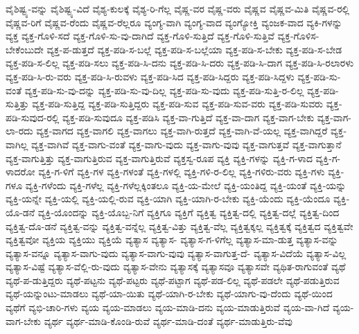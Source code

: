 {ವೈಶಿಷ್ಟ್ಯ-ವನ್ನು
ವೈಶಿಷ್ಟ್ಯ-ವಿದೆ
ವೈಶ್ಯ-ಕುಲಕ್ಕೆ
ವೈಶ್ಯ-ರಿ-ಗೆಲ್ಲ
ವೈಷ್ಣ-ವರ
ವೈಷ್ಣ-ವರು
ವೈಷ್ಣವ
ವೈಷ್ಣವ-ಮಿತಿ
ವೈಷ್ಣವ-ರಲ್ಲಿ
ವೈಷ್ಣವ-ರಿಗೆ
ವೈಷ್ಣವ-ರೆಂದು
ವೈಷ್ಣವ-ರೆಲ್ಲರೂ
ವ್ಯಂಗ್ಯ-ವಾಗಿ
ವ್ಯಂಗ್ಯ-ವಾದ
ವ್ಯಂಗ್ಯೋಕ್ತಿ
ವ್ಯಂಜಕ-ವಾದ
ವ್ಯಕಿ-ಗಳನ್ನು
ವ್ಯಕ್ತ
ವ್ಯಕ್ತ-ಗೊಳಿ-ಸದೆ
ವ್ಯಕ್ತ-ಗೊಳಿ-ಸು-ವು-ದಾಗಿದೆ
ವ್ಯಕ್ತ-ಗೊಳಿ-ಸುತ್ತಿದೆ
ವ್ಯಕ್ತ-ಗೊಳಿ-ಸುತ್ತಿವೆ
ವ್ಯಕ್ತ-ಗೊಳಿಸ-ಬೇಕೆಂಬುದೇ
ವ್ಯಕ್ತ-ಪ-ಡುತ್ತದೆ
ವ್ಯಕ್ತ-ಪಡಿ-ಸ-ಬಲ್ಲೆ
ವ್ಯಕ್ತ-ಪಡಿ-ಸ-ಬಲ್ಲೆಯಾ
ವ್ಯಕ್ತ-ಪಡಿ-ಸ-ಬೇಕು
ವ್ಯಕ್ತ-ಪಡಿ-ಸ-ಬೇಡ
ವ್ಯಕ್ತ-ಪಡಿ-ಸ-ಲಿಲ್ಲ
ವ್ಯಕ್ತ-ಪಡಿ-ಸಲು
ವ್ಯಕ್ತ-ಪಡಿ-ಸಿ-ದನು
ವ್ಯಕ್ತ-ಪಡಿ-ಸಿ-ದರು
ವ್ಯಕ್ತ-ಪಡಿ-ಸಿ-ದಾಗ
ವ್ಯಕ್ತ-ಪಡಿ-ಸಿ-ರಲಾರಳು
ವ್ಯಕ್ತ-ಪಡಿ-ಸಿ-ರು-ವರು
ವ್ಯಕ್ತ-ಪಡಿ-ಸಿ-ರುವಳು
ವ್ಯಕ್ತ-ಪಡಿ-ಸಿದ
ವ್ಯಕ್ತ-ಪಡಿ-ಸಿದ್ದರು
ವ್ಯಕ್ತ-ಪಡಿ-ಸಿದ್ದಳು
ವ್ಯಕ್ತ-ಪಡಿ-ಸು-ವಂತೆ
ವ್ಯಕ್ತ-ಪಡಿ-ಸು-ವು-ದನ್ನು
ವ್ಯಕ್ತ-ಪಡಿ-ಸು-ವು-ದಿಲ್ಲ
ವ್ಯಕ್ತ-ಪಡಿ-ಸು-ವುದು
ವ್ಯಕ್ತ-ಪಡಿ-ಸುತ್ತಿ-ರ-ಲಿಲ್ಲ
ವ್ಯಕ್ತ-ಪಡಿ-ಸುತ್ತಿತ್ತು
ವ್ಯಕ್ತ-ಪಡಿ-ಸುತ್ತಿದ್ದ
ವ್ಯಕ್ತ-ಪಡಿ-ಸುತ್ತಿದ್ದರು
ವ್ಯಕ್ತ-ಪಡಿ-ಸುವ
ವ್ಯಕ್ತ-ಪಡಿ-ಸುವ-ವರು
ವ್ಯಕ್ತ-ಪಡಿ-ಸುವರು
ವ್ಯಕ್ತ-ಪಡಿ-ಸುವುದ-ರಲ್ಲಿ
ವ್ಯಕ್ತ-ಪಡಿ-ಸುವುದೂ
ವ್ಯಕ್ತ-ಪಡಿಸಿ
ವ್ಯಕ್ತ-ವಾ-ಗುತ್ತಿದೆ
ವ್ಯಕ್ತ-ವಾ-ದಾಗ
ವ್ಯಕ್ತ-ವಾಗ-ಬೇಕು
ವ್ಯಕ್ತ-ವಾಗ-ಲಾ-ರದು
ವ್ಯಕ್ತ-ವಾಗದ
ವ್ಯಕ್ತ-ವಾಗಲಿ
ವ್ಯಕ್ತ-ವಾಗಲು
ವ್ಯಕ್ತ-ವಾಗಿ-ರುತ್ತದೆ
ವ್ಯಕ್ತ-ವಾಗಿ-ವೆ-ಯಲ್ಲ
ವ್ಯಕ್ತ-ವಾಗಿದ್ದರೆ
ವ್ಯಕ್ತ-ವಾಗಿಲ್ಲ
ವ್ಯಕ್ತ-ವಾಗಿವೆ
ವ್ಯಕ್ತ-ವಾಗು-ವಂತೆ
ವ್ಯಕ್ತ-ವಾಗು-ವುದು
ವ್ಯಕ್ತ-ವಾಗು-ವುವು
ವ್ಯಕ್ತ-ವಾಗುತ್ತವೆ
ವ್ಯಕ್ತ-ವಾಗುತ್ತಾನೆ
ವ್ಯಕ್ತ-ವಾಗುತ್ತಿತ್ತು
ವ್ಯಕ್ತ-ವಾಗುತ್ತಿರುವ
ವ್ಯಕ್ತ-ವಾಗುತ್ತಿರುವೆ
ವ್ಯಕ್ತಸ್ವ-ರೂಪ
ವ್ಯಕ್ತಿ
ವ್ಯಕ್ತಿ-ಗಳನ್ನು
ವ್ಯಕ್ತಿ-ಗ-ಳಾದ
ವ್ಯಕ್ತಿ-ಗ-ಳಾದರೋ
ವ್ಯಕ್ತಿ-ಗ-ಳಿಗೆ
ವ್ಯಕ್ತಿ-ಗಳ
ವ್ಯಕ್ತಿ-ಗಳಂತೆ
ವ್ಯಕ್ತಿ-ಗಳಲ್ಲಿ
ವ್ಯಕ್ತಿ-ಗಳಿ-ರ-ಲಿಲ್ಲ
ವ್ಯಕ್ತಿ-ಗಳಿರು-ವರು
ವ್ಯಕ್ತಿ-ಗಳು
ವ್ಯಕ್ತಿ-ಗಳೂ
ವ್ಯಕ್ತಿ-ಗಳೆಂದು
ವ್ಯಕ್ತಿ-ಗಳೆಲ್ಲ
ವ್ಯಕ್ತಿ-ಗಳೆಲ್ಲಕ್ಕಿಂತಲೂ
ವ್ಯಕ್ತಿ-ಯ-ಮೇಲೆ
ವ್ಯಕ್ತಿ-ಯಂತಿದ್ದ
ವ್ಯಕ್ತಿ-ಯಂತೆ
ವ್ಯಕ್ತಿ-ಯನ್ನು
ವ್ಯಕ್ತಿ-ಯನ್ನೇ
ವ್ಯಕ್ತಿ-ಯಲ್ಲಿ
ವ್ಯಕ್ತಿ-ಯಲ್ಲಿ-ರುವ
ವ್ಯಕ್ತಿ-ಯಾಗಿ
ವ್ಯಕ್ತಿ-ಯಾಗಿ-ರ-ಬೇಕು
ವ್ಯಕ್ತಿ-ಯೆಂದು
ವ್ಯಕ್ತಿ-ಯೆಂದೂ
ವ್ಯಕ್ತಿ-ಯೊ-ಡನೆ
ವ್ಯಕ್ತಿ-ಯೊಂದನ್ನು
ವ್ಯಕ್ತಿ-ಯೊಬ್ಬ-ನಿಗೆ
ವ್ಯಕ್ತಿಗೂ
ವ್ಯಕ್ತಿಗೆ
ವ್ಯಕ್ತಿತ್ವ
ವ್ಯಕ್ತಿತ್ವ-ದಲ್ಲಿ
ವ್ಯಕ್ತಿತ್ವ-ದಲ್ಲೆ
ವ್ಯಕ್ತಿತ್ವ-ದಿಂದ
ವ್ಯಕ್ತಿತ್ವ-ದೊ-ಡನೆ
ವ್ಯಕ್ತಿತ್ವ-ವನ್ನು
ವ್ಯಕ್ತಿತ್ವ-ವನ್ನೆಲ್ಲ
ವ್ಯಕ್ತಿತ್ವ-ವಿತ್ತು
ವ್ಯಕ್ತಿತ್ವ-ವೆಲ್ಲ
ವ್ಯಕ್ತಿತ್ವಕ್ಕಲ್ಲ
ವ್ಯಕ್ತಿತ್ವಕ್ಕೆ
ವ್ಯಕ್ತಿತ್ವದ
ವ್ಯಕ್ತಿತ್ವವೇ
ವ್ಯಕ್ತಿತ್ವವೋ
ವ್ಯಕ್ತಿಯ
ವ್ಯಕ್ತಿಯು
ವ್ಯಕ್ತಿಯೆ
ವ್ಯತ್ಯಾಸ
ವ್ಯತ್ಯಾಸ-
ವ್ಯತ್ಯಾಸ-ಗ-ಳಿಗೆಲ್ಲ
ವ್ಯತ್ಯಾಸ-ಮಾ-ಡುತ್ತ
ವ್ಯತ್ಯಾಸ-ವನ್ನು
ವ್ಯತ್ಯಾಸ-ವನ್ನೂ
ವ್ಯತ್ಯಾಸ-ವಾಗು-ವುದು
ವ್ಯತ್ಯಾಸ-ವಾಗು-ವುವು
ವ್ಯತ್ಯಾಸ-ವಾಗುತ್ತ-ದೆ-
ವ್ಯತ್ಯಾಸ-ವಿದೆಯೆ
ವ್ಯತ್ಯಾಸ-ವಿಲ್ಲ
ವ್ಯತ್ಯಾಸ-ವಿಷ್ಟೆ
ವ್ಯತ್ಯಾಸ-ವೆಲ್ಲಿ-ರು-ವುದು
ವ್ಯತ್ಯಾಸ-ವೇನು
ವ್ಯತ್ಯಾಸಕ್ಕೆ
ವ್ಯತ್ಯಾಸವೂ
ವ್ಯತ್ಯಾಸವೇ
ವ್ಯಥಿತ-ರಾಗುವಂತೆ
ವ್ಯಥೆ
ವ್ಯಥೆ-ಪ-ಡುತ್ತಿದ್ದರು
ವ್ಯಥೆ-ಪಟ್ಟನು
ವ್ಯಥೆ-ಪಟ್ಟರು
ವ್ಯಥೆ-ಪಟ್ಟಾಗ
ವ್ಯಥೆ-ಪಡ-ಲಿಲ್ಲ
ವ್ಯಥೆ-ಪಡಲೇ
ವ್ಯಥೆ-ಪಡುತ್ತಿರುವ
ವ್ಯಥೆ-ಯನ್ನುಂಟು-ಮಾಡಲು
ವ್ಯಥೆ-ಯಾ-ಯಿತು
ವ್ಯಥೆ-ಯಾಗಿ-ರ-ಬೇಕು
ವ್ಯಥೆ-ಯಾಗು-ವು-ದೆಂದು
ವ್ಯಥೆ-ಯಿಂದ
ವ್ಯಥೆಗೆ
ವ್ಯಭಿ-ಚಾರಿ-ಗಳು
ವ್ಯಯ
ವ್ಯಯ-ಮಾಡಲು
ವ್ಯಯ-ಮಾಡಿ-ದನು
ವ್ಯಯ-ಮಾಡುತ್ತಿರುವೆ
ವ್ಯಯ-ವಾ-ಗಿದೆ
ವ್ಯಯ-ವಾಗ-ಬೇಕು
ವ್ಯರ್ಥ
ವ್ಯರ್ಥ-ಮಾಡಿ-ಕೊಂಡಿ-ರುವೆ
ವ್ಯರ್ಥ-ಮಾಡಿ-ದಂತೆ
ವ್ಯರ್ಥ-ಮಾಡುತ್ತಿರು-ವೆವು
}
